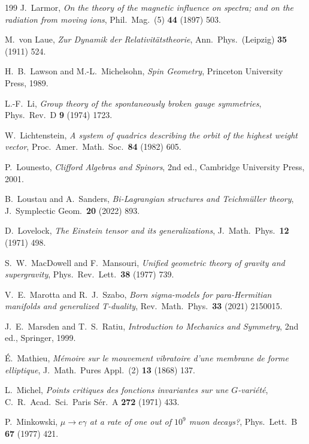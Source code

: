 \begin{thebibliography}{199}
 J.~Larmor, \emph{On the theory of the magnetic influence on spectra; and on the radiation from moving ions}, Phil.~Mag.~(5) \textbf{44} (1897) 503.

 M.~von Laue, \emph{Zur Dynamik der Relativit\"atstheorie}, Ann.~Phys.~(Leipzig) \textbf{35} (1911) 524.

 H.~B.~Lawson and M.-L.~Michelsohn, \emph{Spin Geometry}, Princeton University Press, 1989.

 L.-F.~Li, \emph{Group theory of the spontaneously broken gauge symmetries}, Phys.~Rev.~D \textbf{9} (1974) 1723.

 W.~Lichtenstein, \emph{A system of quadrics describing the orbit of the highest weight vector}, Proc.~Amer.~Math.~Soc.~\textbf{84} (1982) 605.

 P.~Lounesto, \emph{Clifford Algebras and Spinors}, 2nd ed., Cambridge University Press, 2001.

 B.~Loustau and A.~Sanders, \emph{Bi-Lagrangian structures and Teichm\"uller theory}, J.~Symplectic Geom.~\textbf{20} (2022) 893.

 D.~Lovelock, \emph{The Einstein tensor and its generalizations}, J.~Math.~Phys.~\textbf{12} (1971) 498.

 S.~W.~MacDowell and F.~Mansouri, \emph{Unified geometric theory of gravity and supergravity}, Phys.~Rev.~Lett.~\textbf{38} (1977) 739.

 V.~E.~Marotta and R.~J.~Szabo, \emph{Born sigma-models for para-Hermitian manifolds and generalized T-duality}, Rev.~Math.~Phys.~\textbf{33}
(2021) 2150015.

 J.~E.~Marsden and T.~S.~Ratiu, \emph{Introduction to Mechanics and Symmetry}, 2nd ed., Springer, 1999.

 \'E.~Mathieu, \emph{M\'emoire sur le mouvement vibratoire d'une membrane de forme elliptique}, J.~Math.~Pures Appl.~(2) \textbf{13} (1868) 137.

 L.~Michel, \emph{Points critiques des fonctions invariantes sur une $G$-vari\'et\'e}, C.~R.~Acad.~Sci.~Paris S\'er.~A \textbf{272} (1971) 433.

 P.~Minkowski, \emph{$\mu\to e\gamma$ at a rate of one out of $10^9$ muon decays?}, Phys.~Lett.~B \textbf{67} (1977) 421.


\end{thebibliography}
